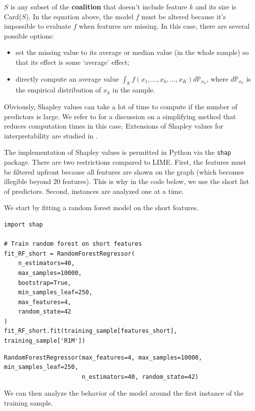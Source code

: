$S$ is any subset of the \textbf{coalition} that doesn't include feature $k$ and its size is Card($S$).
In the equation above, the model $f$ must be altered because it's impossible to evaluate $f$ when features are missing. In this case, there are several possible options:

\begin{itemize}
\item set the missing value to its average or median value (in the whole sample) so that its effect is some `average' effect;
\item directly compute an average value $\int_{\mathbb{R}} f(x_1,\dots,x_k,\dots,x_K)d\mathbb{P}_{x_k}$, where $d\mathbb{P}_{x_k}$ is the empirical distribution of $x_k$ in the sample.
\end{itemize}

Obviously, Shapley values can take a lot of time to compute if the number of predictors is large. We refer to \cite{chen2018shapley} for a discussion on a simplifying method that reduces computation times in this case.
Extensions of Shapley values for interpretability are studied in \cite{lundberg2017unified}.

The implementation of Shapley values is permitted in Python via the \texttt{shap} package. There are two restrictions compared to LIME. First, the features must be filtered upfront because all features are shown on the graph (which becomes illegible beyond 20 features). This is why in the code below, we use the short list of predictors.
Second, instances are analyzed one at a time.

We start by fitting a random forest model on the short features.

\begin{verbatim}
import shap

# Train random forest on short features
fit_RF_short = RandomForestRegressor(
    n_estimators=40,
    max_samples=10000,
    bootstrap=True,
    min_samples_leaf=250,
    max_features=4,
    random_state=42
)
fit_RF_short.fit(training_sample[features_short], training_sample['R1M'])
\end{verbatim}

\begin{verbatim}
RandomForestRegressor(max_features=4, max_samples=10000, min_samples_leaf=250,
                      n_estimators=40, random_state=42)
\end{verbatim}

We can then analyze the behavior of the model around the first instance of the training sample.

